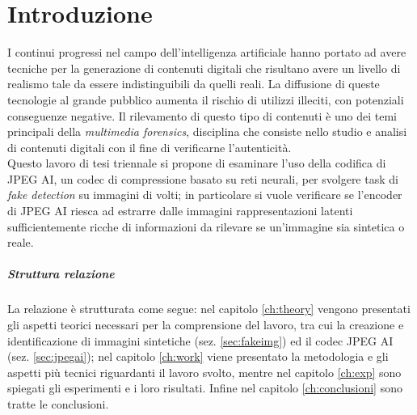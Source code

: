 \chapter*{Introduzione}\label{ch:intro}
I continui progressi nel campo dell'intelligenza artificiale hanno portato ad avere tecniche per la generazione di contenuti digitali che risultano avere un livello di realismo tale da essere indistinguibili da quelli reali. La diffusione di queste tecnologie al grande pubblico aumenta il rischio di utilizzi illeciti, con potenziali conseguenze negative. Il rilevamento di questo tipo di contenuti è uno dei temi principali della \textit{multimedia forensics}, disciplina che consiste nello studio e analisi di contenuti digitali con il fine di verificarne l'autenticità.\\
Questo lavoro di tesi triennale si propone di esaminare l'uso della codifica di JPEG AI, un codec di compressione basato su reti neurali, per svolgere task di \textit{fake detection} su immagini di volti; in particolare si vuole verificare se l'encoder di JPEG AI riesca ad estrarre dalle immagini rappresentazioni latenti sufficientemente ricche di informazioni da rilevare se un'immagine sia sintetica o reale.
\paragraph{Struttura relazione}
La relazione è strutturata come segue: nel capitolo \ref{ch:theory} vengono presentati gli aspetti teorici necessari per la comprensione del lavoro, tra cui la creazione e identificazione di immagini sintetiche (sez. \ref{sec:fakeimg}) ed il codec JPEG AI (sez. \ref{sec:jpegai}); nel capitolo \ref{ch:work} viene presentato la metodologia e gli aspetti più tecnici riguardanti il lavoro svolto, mentre nel capitolo \ref{ch:exp} sono spiegati gli esperimenti e i loro risultati. Infine nel capitolo \ref{ch:conclusioni} sono tratte le conclusioni.

